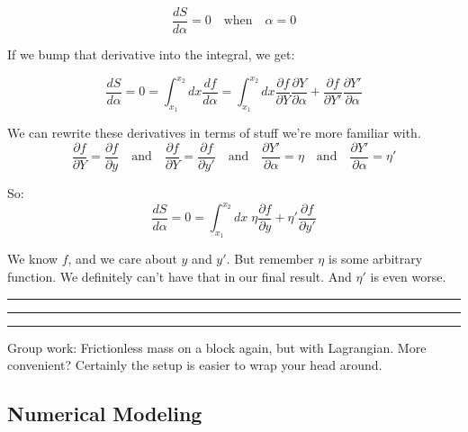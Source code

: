 \documentclass[10pt]{article}
\begin{document}
$$
\frac{dS}{d\alpha} = 0 \quad \mathrm{when} \quad \alpha=0
$$

If we bump that derivative into the integral, we get:

$$
\frac{dS}{d\alpha} = 0 = \displaystyle\int_{x_1}^{x_2} dx \frac{df}{d\alpha} = \displaystyle\int_{x_1}^{x_2} dx \frac{\partial f}{\partial Y} \frac{\partial Y}{\partial \alpha} + \frac{\partial f}{\partial Y'} \frac{\partial Y'}{\partial \alpha}
$$

We can rewrite these derivatives in terms of stuff we're more familiar with.
$$
\frac{\partial f}{\partial Y} = \frac{\partial f}{\partial y} \quad \mathrm{and} \quad \frac{\partial f}{\partial Y} = \frac{\partial f}{\partial y'} \quad \mathrm{and} \quad \frac{\partial Y'}{\partial \alpha} = \eta \quad \mathrm{and} \quad \frac{\partial Y'}{\partial \alpha} = \eta'
$$

So:
$$
\frac{dS}{d\alpha} = 0 = \displaystyle\int_{x_1}^{x_2} dx \; \eta \frac{\partial f}{\partial y} + \eta' \frac{\partial f}{\partial y'}
$$

We know $f$, and we care about $y$ and $y'$. But remember $\eta$ is some arbitrary function. We definitely can't have that in our final result. And $\eta'$ is even worse. 




\hrule

\hrule

\hrule


Group work: Frictionless mass on a block again, but with Lagrangian. More convenient? Certainly the setup is easier to wrap your head around. 






\subsection*{Numerical Modeling}
\end{document}
